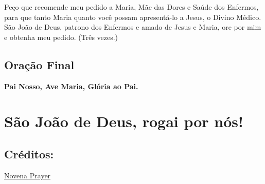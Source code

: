 \documentclass[18pt]{article}
\begin{document}
\begin{justify}
Peço que recomende meu pedido a Maria, Mãe das Dores e Saúde dos Enfermos, para que tanto Maria quanto você possam apresentá-lo a Jesus, o Divino Médico. São João de Deus, patrono dos Enfermos e amado de Jesus e Maria, ore por mim e obtenha meu pedido. (Três vezes.)



\begin{center}
 \subsection{Oração Final}\label{sec:Oração_Final} %
\end{center}


\begin{center}
\textbf{Pai Nosso, Ave Maria, Glória ao Pai.}

\vfill
\section*{São João de Deus, rogai por nós!}

\vfill
\subsection*{Créditos:}
\href{https://novenaprayer.com/st-john-of-god-novena/}{Novena Prayer}

\end{center}


\end{justify}
\end{document}

